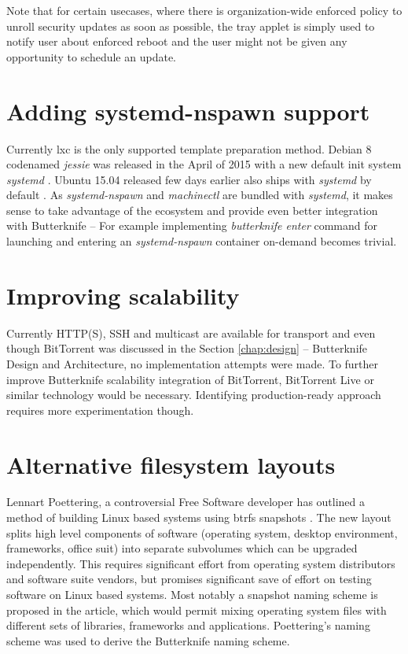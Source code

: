 \documentclass[a4paper,11pt]{kth-mag}
\begin{document}
Note that for certain usecases, where
there is organization-wide enforced policy
to unroll security updates as soon as possible,
the tray applet is simply used to notify
user about enforced reboot and the user might not
be given any opportunity to schedule an update.


\section{Adding systemd-nspawn support}

Currently \acrshort{lxc} is the only supported template preparation method.
Debian 8 codenamed \emph{jessie} was released in the April of 2015
with a new default init system \emph{systemd}
\cite{debian-jessie-released}.
Ubuntu 15.04 released few days earlier also
ships with \emph{systemd} by default
\cite{ubuntu-vivid-vervet-released}.
As \emph{systemd-nspawn} and
\emph{machinectl} are bundled with \emph{systemd},
it makes sense to take advantage of the ecosystem and provide
even better integration with Butterknife --
For example implementing \emph{butterknife enter}
command for launching and entering an \emph{systemd-nspawn}
container on-demand becomes trivial.

\section{Improving scalability}

Currently HTTP(S), SSH and multicast are available
for transport and even though BitTorrent was
discussed in the Section \ref{chap:design} --
Butterknife Design and Architecture,
no implementation attempts were made.
To further improve Butterknife scalability
integration of BitTorrent, BitTorrent Live
or similar technology would be necessary.
Identifying production-ready
approach requires more experimentation though.


\section{Alternative filesystem layouts}

Lennart Poettering, a controversial Free Software developer has outlined a method
of building Linux based systems using \acrshort{btrfs} snapshots
\cite{revisiting-how-we-put-together-linux-systems}.
The new layout splits high level components of software
(operating system, desktop environment, frameworks, office suit)
into separate subvolumes which can be upgraded independently.
This requires significant effort from operating system distributors and
software suite vendors, but promises significant save of effort on testing
software on Linux based systems.
Most notably a snapshot naming scheme is proposed in the article,
which would permit mixing operating system files with different
sets of libraries, frameworks and applications.
Poettering's naming scheme was used to derive the Butterknife naming scheme.


%
%
%
%

\appendix



\twocolumn
\printglossaries
\onecolumn
\end{document}
